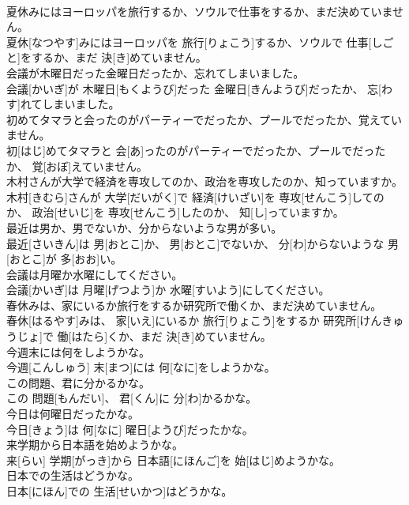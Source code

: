 \documentclass[8pt]{extreport}
\begin{document}
\begin{CJK}{UTF8}{min}
\\	夏休みにはヨーロッパを旅行するか、ソウルで仕事をするか、まだ決めていません。	
\\	夏休[なつやす]みにはヨーロッパを 旅行[りょこう]するか、ソウルで 仕事[しごと]をするか、まだ 決[き]めていません。
\\	会議が木曜日だった金曜日だったか、忘れてしまいました。	
\\	会議[かいぎ]が 木曜日[もくようび]だった 金曜日[きんようび]だったか、 忘[わす]れてしまいました。
\\	初めてタマラと会ったのがパーティーでだったか、プールでだったか、覚えていません。	
\\	初[はじ]めてタマラと 会[あ]ったのがパーティーでだったか、プールでだったか、 覚[おぼ]えていません。
\\	木村さんが大学で経済を専攻してのか、政治を専攻したのか、知っていますか。	
\\	木村[きむら]さんが 大学[だいがく]で 経済[けいざい]を 専攻[せんこう]してのか、 政治[せいじ]を 専攻[せんこう]したのか、 知[し]っていますか。
\\	最近は男か、男でないか、分からないような男が多い。	
\\	最近[さいきん]は 男[おとこ]か、 男[おとこ]でないか、 分[わ]からないような 男[おとこ]が 多[おお]い。
\\	会議は月曜か水曜にしてください。	
\\	会議[かいぎ]は 月曜[げつよう]か 水曜[すいよう]にしてください。
\\	春休みは、家にいるか旅行をするか研究所で働くか、まだ決めていません。	
\\	春休[はるやす]みは、 家[いえ]にいるか 旅行[りょこう]をするか 研究所[けんきゅうじょ]で 働[はたら]くか、まだ 決[き]めていません。
\\	今週末には何をしようかな。	
\\	今週[こんしゅう] 末[まつ]には 何[なに]をしようかな。
\\	この問題、君に分かるかな。	
\\	この 問題[もんだい]、 君[くん]に 分[わ]かるかな。
\\	今日は何曜日だったかな。	
\\	今日[きょう]は 何[なに] 曜日[ようび]だったかな。
\\	来学期から日本語を始めようかな。	
\\	来[らい] 学期[がっき]から 日本語[にほんご]を 始[はじ]めようかな。
\\	日本での生活はどうかな。	
\\	日本[にほん]での 生活[せいかつ]はどうかな。

\end{CJK}
\end{document}
